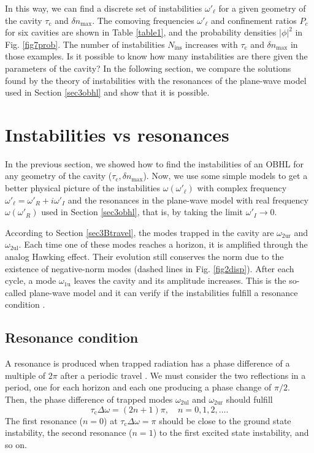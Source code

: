 \documentclass[aps,pra,reprint,amsmath,amssymb,showpacs,groupedaddress,floatfix]{revtex4-1}
\begin{document}
In this way, we can find a discrete set of instabilities $\omega'_\ell$ for a given geometry of the cavity $\tau_\text{c}$ and $\delta n_\text{max}$. The comoving frequencies $\omega'_\ell$ and confinement ratios $P_c$ for six cavities are shown in Table \ref{table1}, and the probability densities $|\phi|^2$ in Fig. \ref{fig7prob}. The number of instabilities $N_\text{ins}$ increases with $\tau_\text{c}$ and $\delta n_{\text{max}}$ in those examples. Is it possible to know how many instabilities are there given the parameters of the cavity? In the following section, we compare the solutions found by the theory of instabilities with the resonances of the plane-wave model used in Section \ref{sec3obhl} and show that it is possible.

\section{Instabilities vs resonances}\label{sec5compa}
In the previous section, we showed how to find the instabilities of an OBHL for any geometry of the cavity ($\tau_\text{c},\delta n_\text{max}$). Now, we use some simple models to get a better physical picture of the instabilities $\omega(\omega'_\ell)$ with complex frequency $\omega'_\ell=\omega'_R+i\omega'_I$ and the resonances in the plane-wave model with real frequency $\omega(\omega'_R)$ used in Section \ref{sec3obhl}, that is, by taking the limit $\omega'_I\rightarrow 0$.

According to Section \ref{sec3Btravel}, the modes trapped in the cavity are $\omega_\text{2ur}$ and $\omega_\text{2ul}$. Each time one of these modes reaches a horizon, it is amplified through the analog Hawking effect. Their evolution still conserves the norm due to the existence of negative-norm modes (dashed lines in Fig. \ref{fig2disp}). After each cycle, a mode $\omega_{\text{1u}}$ leaves the cavity and its amplitude increases. This is the so-called plane-wave model and it can verify if the instabilities fulfill a resonance condition \cite{Leonhardt2007,GaonaReyes2017}.

\subsection{Resonance condition}\label{sec5Ares}
A resonance is produced when trapped radiation has a phase difference of a multiple of $2\pi$ after a periodic travel \cite{Leonhardt2007,2018Bermudez}. We must consider the two reflections in a period, one for each horizon and each one producing a phase change of $\pi/2$. Then, the phase difference of trapped modes $\omega_\text{2ul}$ and $\omega_\text{2ur}$ should fulfill
\begin{equation}\label{match}
\tau_\text{c} \Delta \omega=(2n+1)\pi, \quad n=0,1,2,\dots .
\end{equation}
The first resonance ($n=0$) at $\tau_\text{c} \Delta \omega=\pi$ should be close to the ground state instability, the second resonance ($n=1$) to the first excited state instability, and so on.
\end{document}
